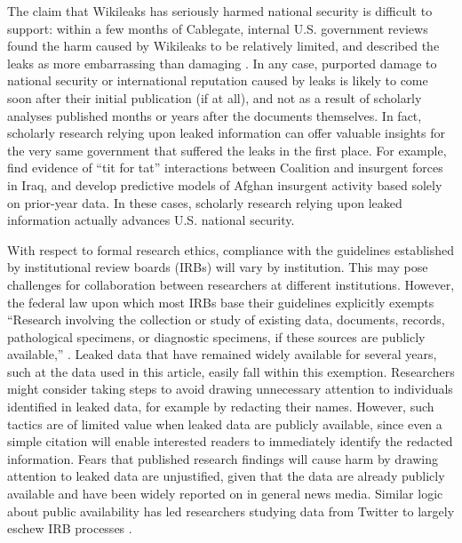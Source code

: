 \documentclass[12pt]{article}
\begin{document}
The claim that Wikileaks has seriously harmed national security 
is difficult to support: within a few months of Cablegate, internal U.S. government 
reviews found the harm caused by Wikileaks to be relatively limited, and described the leaks as more embarrassing than 
damaging \citep{hosenball2011u.s.}. In any case, purported damage to national security or international reputation caused by leaks is likely to come soon after their initial publication (if at all), 
and not as a result of scholarly analyses published months or years after the documents themselves. 
In fact, scholarly research relying upon leaked information can offer valuable insights for the very same 
government that suffered the leaks in the first place. For example, \citet{linke2012space-time} find evidence of 
``tit for tat'' interactions between Coalition and insurgent forces in Iraq, and \citet{zammit-mangion2012point} 
develop predictive models of Afghan insurgent activity based solely on prior-year data. In these cases, 
scholarly research relying upon leaked information actually advances U.S. national security.

With respect to formal research ethics, compliance with the guidelines established by institutional review boards (IRBs) will vary by institution. This may pose challenges for collaboration between researchers at different institutions.
However, the federal law upon which most IRBs base their guidelines explicitly exempts 
``Research involving the collection or study of existing data, documents, records, pathological specimens, or diagnostic
specimens, if these sources are publicly available,'' \citep[45 CFR 46.101 (b)(4)]{u.s._government2009code}.
Leaked data that have remained widely available for several years, such at the data used in this article, 
easily fall within this exemption.
Researchers might consider taking steps to avoid drawing unnecessary attention 
to individuals identified in leaked data, for example by redacting their names. However, such tactics 
are of limited value when leaked data are publicly available, since even a simple citation will enable 
interested readers to immediately identify the redacted information.
Fears that published research findings will cause harm by drawing attention to leaked data are unjustified, 
given that the data are already publicly available and have been widely reported on in general news media. 
Similar logic about public availability has led researchers studying data from Twitter to largely eschew 
IRB processes \citep{zimmer2014topology}.
\end{document}
